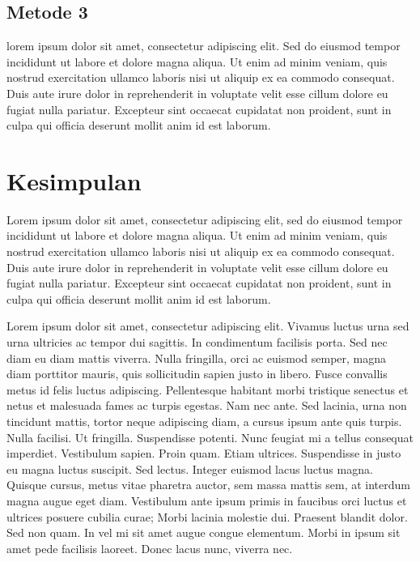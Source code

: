 \documentclass[a4paper]{article}
\begin{document}
\subsection{Metode 3}
lorem ipsum dolor sit amet, consectetur adipiscing elit. Sed do eiusmod tempor incididunt ut labore et dolore magna aliqua. Ut enim ad minim veniam, quis nostrud exercitation ullamco laboris nisi ut aliquip ex ea commodo consequat. Duis aute irure dolor in reprehenderit in voluptate velit esse cillum dolore eu fugiat nulla pariatur. Excepteur sint occaecat cupidatat non proident, sunt in culpa qui officia deserunt mollit anim id est laborum.
\newpage

\section{Kesimpulan}
Lorem ipsum dolor sit amet, consectetur adipiscing elit, sed do eiusmod tempor incididunt ut labore et dolore magna aliqua. Ut enim ad minim veniam, quis nostrud exercitation ullamco laboris nisi ut aliquip ex ea commodo consequat. Duis aute irure dolor in reprehenderit in voluptate velit esse cillum dolore eu fugiat nulla pariatur. Excepteur sint occaecat cupidatat non proident, sunt in culpa qui officia deserunt mollit anim id est laborum.

Lorem ipsum dolor sit amet, consectetur adipiscing elit. Vivamus luctus urna sed urna ultricies ac tempor dui sagittis. In condimentum facilisis porta. Sed nec diam eu diam mattis viverra. Nulla fringilla, orci ac euismod semper, magna diam porttitor mauris, quis sollicitudin sapien justo in libero. Fusce convallis metus id felis luctus adipiscing. Pellentesque habitant morbi tristique senectus et netus et malesuada fames ac turpis egestas. Nam nec ante. Sed lacinia, urna non tincidunt mattis, tortor neque adipiscing diam, a cursus ipsum ante quis turpis. Nulla facilisi. Ut fringilla. Suspendisse potenti. Nunc feugiat mi a tellus consequat imperdiet. Vestibulum sapien. Proin quam. Etiam ultrices. Suspendisse in justo eu magna luctus suscipit. Sed lectus. Integer euismod lacus luctus magna. Quisque cursus, metus vitae pharetra auctor, sem massa mattis sem, at interdum magna augue eget diam. Vestibulum ante ipsum primis in faucibus orci luctus et ultrices posuere cubilia curae; Morbi lacinia molestie dui. Praesent blandit dolor. Sed non quam. In vel mi sit amet augue congue elementum. Morbi in ipsum sit amet pede facilisis laoreet. Donec lacus nunc, viverra nec.
\end{document}
